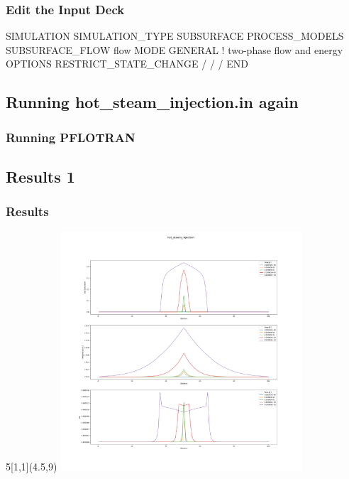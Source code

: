 \documentclass{beamer}
\begin{document}
\begin{frame}[fragile]\frametitle{Edit the Input Deck}

\begin{semiverbatim}

SIMULATION
  SIMULATION_TYPE SUBSURFACE
  PROCESS_MODELS
    SUBSURFACE_FLOW flow
      MODE GENERAL ! two-phase flow and energy
      OPTIONS
        RESTRICT_STATE_CHANGE
      /
    /
  /
END

\end{semiverbatim}

\end{frame}
\subsection{Running hot_steam_injection.in again}

\begin{frame}[fragile]\frametitle{Running PFLOTRAN}


\end{frame}

\subsection{Results 1}

\begin{frame}[fragile]\frametitle{Results}
\begin{textblock}{5}[1,1](4.5,9)
\includegraphics[height=3.5in]{./hot_steam_injection_bad_plots.png}
\end{textblock}
\end{frame}
\end{document}
